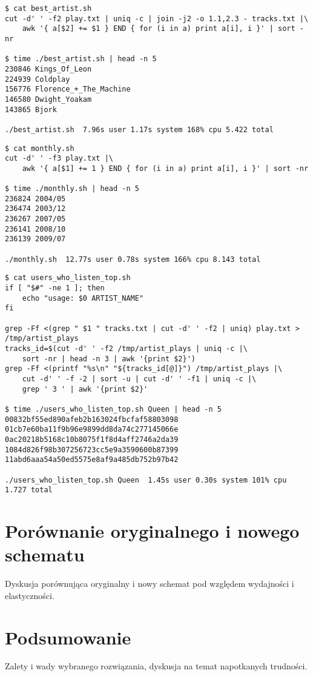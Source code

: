 \documentclass[a4paper,11pt]{article}
\begin{document}
\begin{footnotesize}
\begin{verbatim}
$ cat best_artist.sh
cut -d' ' -f2 play.txt | uniq -c | join -j2 -o 1.1,2.3 - tracks.txt |\
    awk '{ a[$2] += $1 } END { for (i in a) print a[i], i }' | sort -nr

$ time ./best_artist.sh | head -n 5
230846 Kings_Of_Leon
224939 Coldplay
156776 Florence_+_The_Machine
146580 Dwight_Yoakam
143865 Bjork

./best_artist.sh  7.96s user 1.17s system 168% cpu 5.422 total
\end{verbatim}
\end{footnotesize}


\begin{footnotesize}
\begin{verbatim}
$ cat monthly.sh
cut -d' ' -f3 play.txt |\
    awk '{ a[$1] += 1 } END { for (i in a) print a[i], i }' | sort -nr

$ time ./monthly.sh | head -n 5
236824 2004/05
236474 2003/12
236267 2007/05
236141 2008/10
236139 2009/07

./monthly.sh  12.77s user 0.78s system 166% cpu 8.143 total
\end{verbatim}
\end{footnotesize}


\begin{footnotesize}
\begin{verbatim}
$ cat users_who_listen_top.sh
if [ "$#" -ne 1 ]; then
    echo "usage: $0 ARTIST_NAME"
fi

grep -Ff <(grep " $1 " tracks.txt | cut -d' ' -f2 | uniq) play.txt > /tmp/artist_plays
tracks_id=$(cut -d' ' -f2 /tmp/artist_plays | uniq -c |\
    sort -nr | head -n 3 | awk '{print $2}')
grep -Ff <(printf "%s\n" "${tracks_id[@]}") /tmp/artist_plays |\
    cut -d' ' -f -2 | sort -u | cut -d' ' -f1 | uniq -c |\
    grep ' 3 ' | awk '{print $2}'

$ time ./users_who_listen_top.sh Queen | head -n 5
00832bf55ed890afeb2b163024fbcfaf58803098
01cb7e60ba11f9b96e9899dd8da74c277145066e
0ac20218b5168c10b8075f1f8d4aff2746a2da39
1084d826f98b307256723cc5e9a3590600b87399
11abd6aaa54a50ed5575e8af9a485db752b97b42

./users_who_listen_top.sh Queen  1.45s user 0.30s system 101% cpu 1.727 total
\end{verbatim}
\end{footnotesize}


\section{Porównanie oryginalnego i nowego schematu}

Dyskusja porównująca oryginalny i nowy schemat pod względem wydajności i elastyczności.

\section{Podsumowanie}

Zalety i wady wybranego rozwiązania, dyskusja na temat napotkanych trudności.
\end{document}
